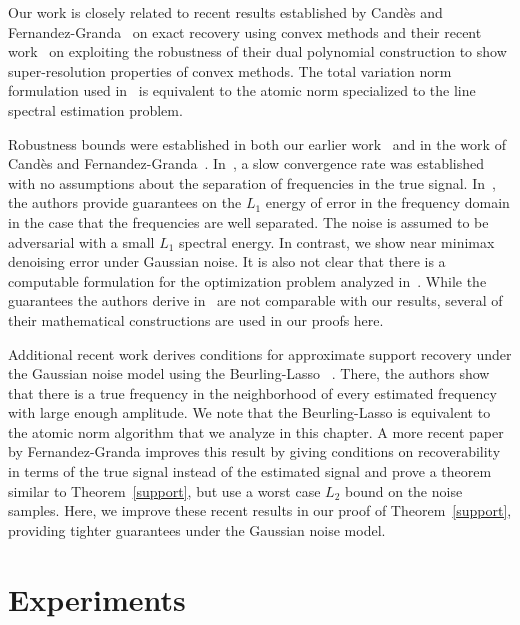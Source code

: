 Our work is closely related to recent results established by Cand\`es and
Fernandez-Granda~\cite{cg_exact12} on exact recovery using convex methods and
their recent work~\cite{cg_noisy} on exploiting the robustness of their dual
polynomial construction to show super-resolution properties of convex methods.
The total variation norm formulation used in~\cite{cg_noisy} is equivalent to
the atomic norm specialized to the line spectral estimation problem.

Robustness bounds were established in both our earlier work~\cite{btr12} and in
the work of Cand\`es and Fernandez-Granda~\cite{cg_noisy}. In~\cite{btr12}, a
slow convergence rate was established with no assumptions about the separation
of frequencies in the true signal. In~\cite{cg_noisy}, the authors provide
guarantees on the $L_1$ energy of error in the frequency domain in the case
that the frequencies are well separated. The noise is assumed to be adversarial
with a small $L_1$ spectral energy. In contrast, we show near minimax
denoising error under Gaussian noise. It is also not clear that there is a
computable formulation for the optimization problem analyzed
in~\cite{cg_noisy}. While the guarantees the authors derive in~\cite{cg_noisy}
are not comparable with our results, several of their mathematical
constructions are used in our proofs here.

Additional recent work derives conditions for approximate support recovery
under the Gaussian noise model using the Beurling-Lasso ~\cite{azais}. There,
the authors show that there is a true frequency in the neighborhood of every
estimated frequency with large enough amplitude. We note that the
Beurling-Lasso is equivalent to the atomic norm algorithm that we analyze in
this chapter. A more recent paper by Fernandez-Granda{\cite{granda2}} improves
this result by giving conditions on recoverability in terms of the true signal
instead of the estimated signal and prove a theorem similar to
Theorem~\ref{support}, but use a worst case $L_2$ bound on the noise samples.
Here, we improve these recent results in our proof of Theorem~\ref{support},
providing tighter guarantees under the Gaussian noise model.
 


\section{Experiments}
\label{sec:experiments}

